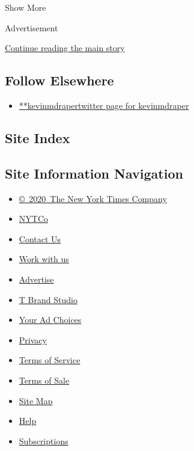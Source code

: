Show More

Advertisement

\protect\hyperlink{after-mid2}{Continue reading the main story}

\hypertarget{follow-elsewhere}{%
\subsection{Follow Elsewhere}\label{follow-elsewhere}}

\begin{itemize}
\tightlist
\item
  \href{https://twitter.com/kevinmdraper}{**kevinmdrapertwitter page for
  kevinmdraper}
\end{itemize}

\hypertarget{site-index}{%
\subsection{Site Index}\label{site-index}}

\hypertarget{site-information-navigation}{%
\subsection{Site Information
Navigation}\label{site-information-navigation}}

\begin{itemize}
\tightlist
\item
  \href{https://help.nytimes3xbfgragh.onion/hc/en-us/articles/115014792127-Copyright-notice}{©~2020~The
  New York Times Company}
\end{itemize}

\begin{itemize}
\tightlist
\item
  \href{https://www.nytco.com/}{NYTCo}
\item
  \href{https://help.nytimes3xbfgragh.onion/hc/en-us/articles/115015385887-Contact-Us}{Contact
  Us}
\item
  \href{https://www.nytco.com/careers/}{Work with us}
\item
  \href{https://nytmediakit.com/}{Advertise}
\item
  \href{http://www.tbrandstudio.com/}{T Brand Studio}
\item
  \href{https://www.nytimes3xbfgragh.onion/privacy/cookie-policy\#how-do-i-manage-trackers}{Your
  Ad Choices}
\item
  \href{https://www.nytimes3xbfgragh.onion/privacy}{Privacy}
\item
  \href{https://help.nytimes3xbfgragh.onion/hc/en-us/articles/115014893428-Terms-of-service}{Terms
  of Service}
\item
  \href{https://help.nytimes3xbfgragh.onion/hc/en-us/articles/115014893968-Terms-of-sale}{Terms
  of Sale}
\item
  \href{https://spiderbites.nytimes3xbfgragh.onion}{Site Map}
\item
  \href{https://help.nytimes3xbfgragh.onion/hc/en-us}{Help}
\item
  \href{https://www.nytimes3xbfgragh.onion/subscription?campaignId=37WXW}{Subscriptions}
\end{itemize}
